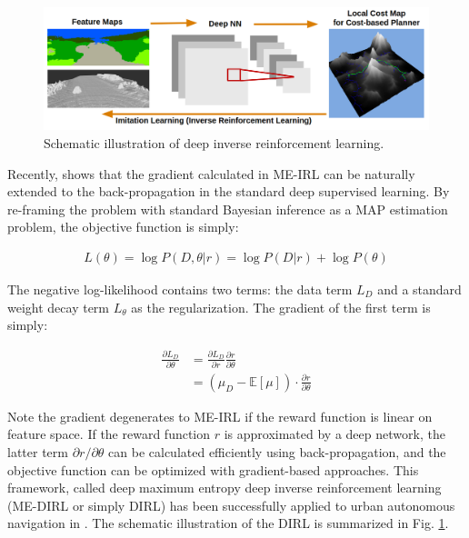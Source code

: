 \documentclass[../thesis.tex]{subfiles}
\begin{document}
 
 
\begin{figure}[t]
      \begin{center}
       \centerline{\includegraphics[width=0.9\columnwidth]{./DIRL/fig/dirl_pipeline.png}}
            \caption{Schematic illustration of deep inverse reinforcement learning.}
            \label{fig:dirl_diagram}
      \end{center}
      \vskip -0.5in
\end{figure}
 
Recently, \citet{wulfmeier2015maximum} shows that the gradient calculated in ME-IRL can be naturally extended to the back-propagation in the standard deep supervised learning.
By re-framing the problem with standard Bayesian inference as a MAP estimation problem, the objective function is simply:
 
\begin{align}
L(\theta) = \log P(D,\theta|r) = \log P(D|r) + \log P(\theta) \label{equ:dirl_obj}
\end{align}
 
The negative log-likelihood contains two terms: the data term $L_{D}$ and a standard weight decay term $L_{\theta}$ as the regularization.
The gradient of the first term is simply:
 
\begin{align}
\frac{\partial L_D}{\partial \theta} &= \frac{\partial L_D}{\partial r} \frac{\partial r}{\partial \theta} \\
&= (\mu_D - \mathbb{E}[\mu]) \cdot \frac{\partial r}{\partial \theta} \label{equ:dirl_grad}
\end{align}
 
Note the gradient degenerates to ME-IRL if the reward function is linear on feature space.
If the reward function $r$ is approximated by a deep network, the latter term $\partial r / \partial \theta$ can be calculated efficiently using back-propagation, and the objective function can be optimized with gradient-based approaches.
This framework, called deep maximum entropy deep inverse reinforcement learning (ME-DIRL or simply DIRL) has been successfully applied to urban autonomous navigation in \cite{wulfmeier2016watch}.
The schematic illustration of the DIRL is summarized in Fig. \ref{fig:dirl_diagram}.
 
 
 
 
\end{document}
